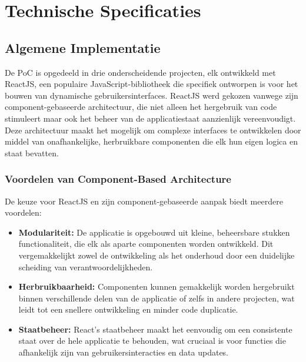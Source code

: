 \section{Technische Specificaties}

\subsection{Algemene Implementatie}
De PoC is opgedeeld in drie onderscheidende projecten, elk ontwikkeld met ReactJS, een populaire JavaScript-bibliotheek die specifiek ontworpen is voor het bouwen van dynamische gebruikersinterfaces. ReactJS werd gekozen vanwege zijn component-gebaseerde architectuur, die niet alleen het hergebruik van code stimuleert maar ook het beheer van de applicatiestaat aanzienlijk vereenvoudigt. Deze architectuur maakt het mogelijk om complexe interfaces te ontwikkelen door middel van onafhankelijke, herbruikbare componenten die elk hun eigen logica en staat bevatten.

\subsubsection{Voordelen van Component-Based Architecture}
De keuze voor ReactJS en zijn component-gebaseerde aanpak biedt meerdere voordelen:
\begin{itemize}
    \item \textbf{Modulariteit:} De applicatie is opgebouwd uit kleine, beheersbare stukken functionaliteit, die elk als aparte componenten worden ontwikkeld. Dit vergemakkelijkt zowel de ontwikkeling als het onderhoud door een duidelijke scheiding van verantwoordelijkheden.
    \item \textbf{Herbruikbaarheid:} Componenten kunnen gemakkelijk worden hergebruikt binnen verschillende delen van de applicatie of zelfs in andere projecten, wat leidt tot een snellere ontwikkeling en minder code duplicatie.
    \item \textbf{Staatbeheer:} React’s staatbeheer maakt het eenvoudig om een consistente staat over de hele applicatie te behouden, wat cruciaal is voor functies die afhankelijk zijn van gebruikersinteracties en data updates.
\end{itemize}

